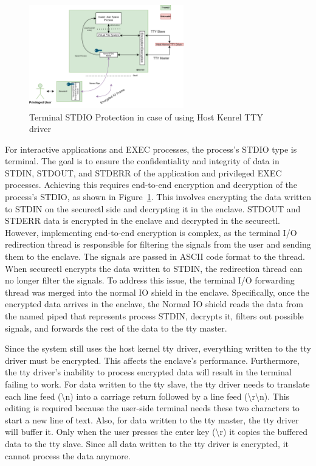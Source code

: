 \begin{figure}[htp]
    \centering
    \includegraphics[width=0.6\textwidth]{images/terminal_shiled2.png}
    \caption[Terminal STDIO Protection in case of using Host Kenrel TTY Driver]{Terminal STDIO Protection in case of using Host Kenrel TTY driver}
    \label{fig:terminal_shiled2}
\end{figure}

For interactive applications and EXEC processes, the process's STDIO type is terminal. The goal is to ensure the confidentiality and integrity of data in STDIN, STDOUT, and STDERR of the application and privileged EXEC processes. Achieving this 
requires end-to-end encryption and decryption of the process's STDIO, as shown in Figure~\ref{fig:terminal_shiled2}. This involves encrypting the data written to STDIN on the securectl side and decrypting it in the enclave. STDOUT and STDERR data is encrypted in the enclave and decrypted in the 
securectl. However, implementing end-to-end encryption is complex, as the terminal I/O redirection thread is responsible for filtering the signals from the user and sending them to the enclave. The signals are passed in ASCII code format to the 
thread. When securectl encrypts the data written to STDIN, the redirection thread can no longer filter the signals. To address this issue, the terminal I/O forwarding thread was merged into the normal IO shield in the enclave. Specifically, once 
the encrypted data arrives in the enclave, the Normal IO shield reads the data from the named piped that represents process STDIN, decrypts it, filters out possible signals, and forwards the rest of the data to the tty master.

Since the system still uses the host kernel tty driver, everything written to the tty driver must be encrypted. This affects the enclave's performance. Furthermore, the tty driver's inability to process encrypted data will result in the terminal 
failing to work. For data written to the tty slave, the tty driver needs to translate each line feed (\textbackslash n) into a carriage return followed by a line feed (\textbackslash r\textbackslash n). This editing is required because the user-side terminal needs these two characters 
to start a new line of text. Also, for data written to the tty master, the tty driver will buffer it. Only when the user presses the enter key (\textbackslash r) it copies the buffered data to the tty slave. Since all data written to the tty driver is encrypted, 
it cannot process the data anymore.

